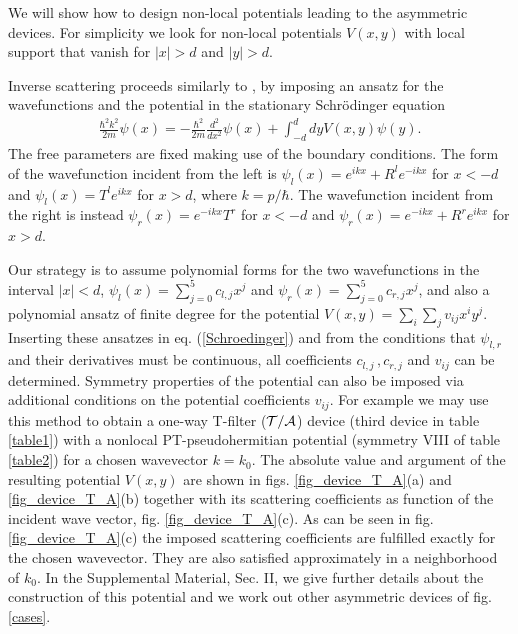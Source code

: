 We will show  how to design non-local potentials
leading to the asymmetric devices.
For simplicity we look for  non-local potentials $V(x,y)$ with local support
that vanish  for $|x| >d$ and $|y| >d$.

Inverse scattering proceeds similarly to \cite{Palao1998},
by imposing an ansatz
for the wavefunctions and the potential
in the stationary Schr\"odinger equation
%
\begin{eqnarray}
\frac{\hbar^2k^2}{2m} \psi (x) = - \frac{\hbar^2}{2m} \frac{d^2}{dx^2} \psi (x)
+\!\!\int_{-d}^d \!dy V(x, y) \psi(y).
\label{Schroedinger}
\end{eqnarray}
%
The free parameters are fixed making use of the boundary conditions.
The form of the wavefunction incident from the left is
$\psi_l(x) = e^{i k x} + R^l e^{-i k x}$ for $x < -d$ and $\psi_l (x) = T^l e^{i k x}$ for $x > d$,
where  $k=p/\hbar$.
The wavefunction incident from the right is instead
$\psi_r(x) = e^{-ikx} T^r$ for $x < -d$ and $\psi_r (x) = e^{-i k x} + R^r e^{i k x}$ for $x > d$.

Our strategy is to assume  polynomial forms for the two wavefunctions in the interval $|x| < d$,
$\psi_l (x) = \sum_{j=0}^5 c_{l,j} x^j$ and $\psi_r (x) = \sum_{j=0}^5 c_{r,j} x^j$, and also a
polynomial ansatz of finite degree for the potential $V(x,y) = \sum_i \sum_j v_{ij} x^i y^j$.
Inserting these ansatzes in eq. (\ref{Schroedinger}) and from the conditions that $\psi_{l,r}$
and their derivatives must be continuous, all coefficients $c_{l,j}\,,c_{r,j}$ and $v_{ij}$ can be determined.
Symmetry properties of the potential can also be imposed via additional conditions on
the potential coefficients $v_{ij}$. For example we may use this method to obtain a one-way T-filter ($\cal{T/A}$) device (third device in table \ref{table1}) with a nonlocal PT-pseudohermitian potential (symmetry VIII of table \ref{table2}) for a chosen wavevector $k = k_0$. The absolute value and argument of the resulting potential $V(x,y)$ are shown in figs. \ref{fig_device_T_A}(a) and \ref{fig_device_T_A}(b) together with its scattering coefficients as function of the incident wave vector, fig. \ref{fig_device_T_A}(c). As can be seen in fig. \ref{fig_device_T_A}(c) the imposed scattering coefficients are fulfilled exactly for the chosen wavevector. They are also satisfied approximately in a neighborhood of $k_0$. In the  Supplemental Material, Sec. II, we give further details about the construction of this potential and we work out other asymmetric devices of fig. \ref{cases}.
%
%
%
%
%


